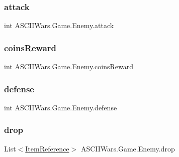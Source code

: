 \subsubsection{\texorpdfstring{attack}{attack}}
{\footnotesize\ttfamily int A\+S\+C\+I\+I\+Wars.\+Game.\+Enemy.\+attack}

\hypertarget{class_a_s_c_i_i_wars_1_1_game_1_1_enemy_abc760eceff65559b850946aed3c9ee73}{}\label{class_a_s_c_i_i_wars_1_1_game_1_1_enemy_abc760eceff65559b850946aed3c9ee73} 
\subsubsection{\texorpdfstring{coins\+Reward}{coinsReward}}
{\footnotesize\ttfamily int A\+S\+C\+I\+I\+Wars.\+Game.\+Enemy.\+coins\+Reward}

\hypertarget{class_a_s_c_i_i_wars_1_1_game_1_1_enemy_a5a07bdd5189ac07e2c46fab4c2ee2d32}{}\label{class_a_s_c_i_i_wars_1_1_game_1_1_enemy_a5a07bdd5189ac07e2c46fab4c2ee2d32} 
\subsubsection{\texorpdfstring{defense}{defense}}
{\footnotesize\ttfamily int A\+S\+C\+I\+I\+Wars.\+Game.\+Enemy.\+defense}

\hypertarget{class_a_s_c_i_i_wars_1_1_game_1_1_enemy_ad88da17a5d3175ec7424b43a7047f621}{}\label{class_a_s_c_i_i_wars_1_1_game_1_1_enemy_ad88da17a5d3175ec7424b43a7047f621} 
\subsubsection{\texorpdfstring{drop}{drop}}
{\footnotesize\ttfamily List$<$\hyperlink{class_a_s_c_i_i_wars_1_1_game_1_1_item_reference}{Item\+Reference}$>$ A\+S\+C\+I\+I\+Wars.\+Game.\+Enemy.\+drop}

\hypertarget{class_a_s_c_i_i_wars_1_1_game_1_1_enemy_a9240cccb69253549bf7d72620a3c9171}{}\label{class_a_s_c_i_i_wars_1_1_game_1_1_enemy_a9240cccb69253549bf7d72620a3c9171} 
